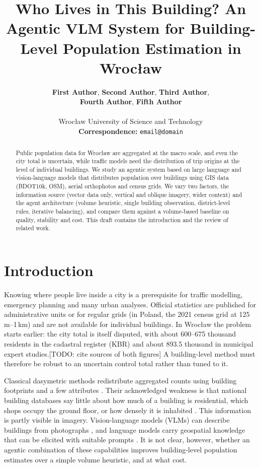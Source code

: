 \documentclass[11pt]{article}
\title{Who Lives in This Building? An Agentic VLM System for Building-Level Population Estimation in Wrocław}
\author{
  \textbf{First Author},
  \textbf{Second Author},
  \textbf{Third Author},
\\
  \textbf{Fourth Author},
  \textbf{Fifth Author}
\\
\\
  Wrocław University of Science and Technology
\\
  \small{
    \textbf{Correspondence:} \texttt{email@domain}
  }
}
\newcommand{\todo}[1]{{\color{red}[TODO: #1]}}
\begin{document}
\maketitle

\begin{abstract}
Public population data for Wrocław are aggregated at the macro scale, and even the city total is uncertain, while traffic models need the distribution of trip origins at the level of individual buildings.
We study an agentic system based on large language and vision-language models that distributes population over buildings using GIS data (BDOT10k, OSM), aerial orthophotos and census grids.
We vary two factors, the information source (vector data only, vertical and oblique imagery, wider context) and the agent architecture (volume heuristic, single building observation, district-level rules, iterative balancing), and compare them against a volume-based baseline on quality, stability and cost.
This draft contains the introduction and the review of related work.
\end{abstract}

\section{Introduction}

Knowing where people live inside a city is a prerequisite for traffic modelling, emergency planning and many urban analyses.
Official statistics are published for administrative units or for regular grids (in Poland, the 2021 census grid at 125\,m--1\,km) and are not available for individual buildings.
In Wrocław the problem starts earlier: the city total is itself disputed, with about 600--675 thousand residents in the cadastral register (KBR) and about 893.5 thousand in municipal expert studies.\todo{cite sources of both figures}
A building-level method must therefore be robust to an uncertain control total rather than tuned to it.

Classical dasymetric methods redistribute aggregated counts using building footprints and a few attributes \citep{mennis2003generating,calka2016redistribution,pirowski2018detailed,pirowski2024dasymetric}.
Their acknowledged weakness is that national building databases say little about how much of a building is residential, which shops occupy the ground floor, or how densely it is inhabited \citep{pirowski2018detailed}.
This information is partly visible in imagery.
Vision-language models (VLMs) can describe buildings from photographs \citep{yang2024streetview,openfacades2025}, and language models carry geospatial knowledge that can be elicited with suitable prompts \citep{manvi2024geollm}.
It is not clear, however, whether an agentic combination of these capabilities improves building-level population estimates over a simple volume heuristic, and at what cost.
\end{document}
